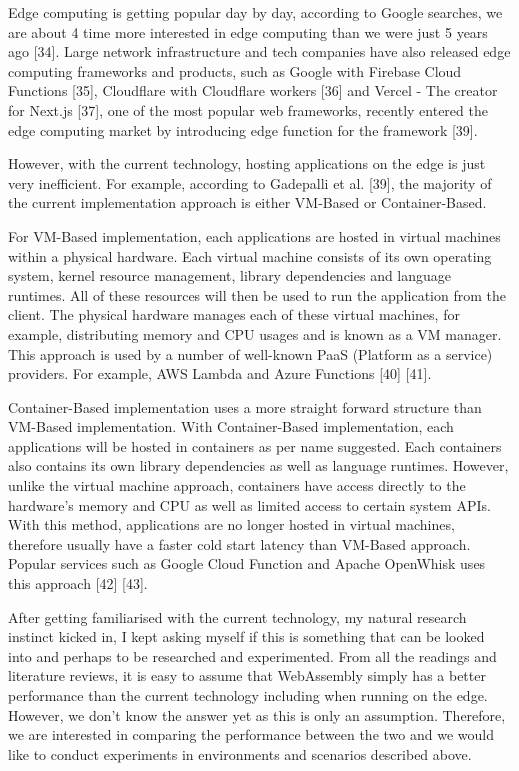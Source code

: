 \bigskip

Edge computing is getting popular day by day, according to Google searches, we are about 4 time more interested in edge computing than we were just 5 years ago [34]. Large network infrastructure and tech companies have also released edge computing frameworks and products, such as Google with Firebase Cloud Functions [35], Cloudflare with Cloudflare workers [36] and Vercel - The creator for Next.js [37], one of the most popular web frameworks, recently entered the edge computing market by introducing edge function for the framework [39].

However, with the current technology, hosting applications on the edge is just very inefficient. For example, according to Gadepalli et al. [39], the majority of the current implementation approach is either VM-Based or Container-Based.

For VM-Based implementation, each applications are hosted in virtual machines within a physical hardware. Each virtual machine consists of its own operating system, kernel resource management, library dependencies and language runtimes. All of these resources will then be used to run the application from the client. The physical hardware manages each of these virtual machines, for example, distributing memory and CPU usages and is known as a VM manager. This approach is used by a number of well-known PaaS (Platform as a service) providers. For example, AWS Lambda and Azure Functions [40] [41].

Container-Based implementation uses a more straight forward structure than VM-Based implementation. With Container-Based implementation, each applications will be hosted in containers as per name suggested. Each containers also contains its own library dependencies as well as language runtimes. However, unlike the virtual machine approach, containers have access directly to the hardware's memory and CPU as well as limited access to certain system APIs. With this method, applications are no longer hosted in virtual machines, therefore usually have a faster cold start latency than VM-Based approach. Popular services such as Google Cloud Function and Apache OpenWhisk uses this approach [42] [43].

After getting familiarised with the current technology, my natural research instinct kicked in, I kept asking myself if this is something that can be looked into and perhaps to be researched and experimented. From all the readings and literature reviews, it is easy to assume that WebAssembly simply has a better performance than the current technology including when running on the edge. However, we don't know the answer yet as this is only an assumption. Therefore, we are interested in comparing the performance between the two and we would like to conduct experiments in environments and scenarios described above.

